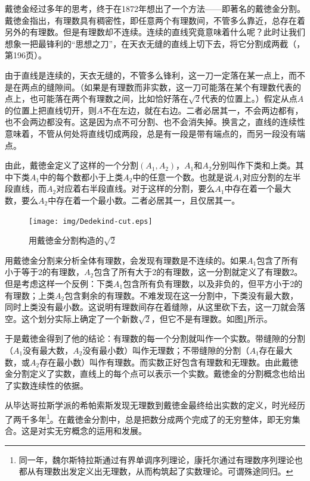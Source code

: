 \documentclass{article}
\begin{document}
戴徳金经过多年的思考，终于在1872年想出了一个方法——即著名的戴徳金分割。戴徳金指出，有理数具有稠密性，即任意两个有理数间，不管多么靠近，总存在着另外的有理数。但是有理数却不连续。连续的直线究竟意味着什么呢？此时让我们想象一把最锋利的“思想之刀”，在天衣无缝的直线上切下去，将它分割成两截（\cite{HanXueTao16}，第196页）。

由于直线是连续的，天衣无缝的，不管多么锋利，这一刀一定落在某一点上，而不是在两点的缝隙间。（如果是有理数而非实数，这一刀可能落在某个有理数代表的点上，也可能落在两个有理数之间，比如恰好落在$\sqrt{2}$代表的位置上。）假定从点$A$的位置上把直线切开，则$A$不在左边，就在右边。二者必居其一，不会两边都有，也不会两边都没有。这是因为点不可分割、也不会消失掉。换言之，直线的连续性意味着，不管从何处将直线切成两段，总是有一段是带有端点的，而另一段没有端点。

由此，戴徳金定义了这样的一个分割$(A_1, A_2)$，$A_1$和$A_2$分别叫作下类和上类。其中下类$A_1$中的每个数都小于上类$A_2$中的任意一个数。也就是说$A_1$对应分割的左半段直线，而$A_2$对应着右半段直线。对于这样的分割，要么$A_1$中存在着一个最大数，要么$A_2$中存在着一个最小数。二者必居其一，且仅居其一。

\begin{figure}[htbp]
 \centering
 \texttt{[image: img/Dedekind-cut.eps]}
 \caption{用戴徳金分割构造的$\sqrt{2}$}
 \label{fig:Dedekind-cut}
\end{figure}

用戴徳金分割来分析全体有理数，会发现有理数是不连续的。如果$A_1$包含了所有小于等于2的有理数，$A_2$包含了所有大于2的有理数，这一分割就定义了有理数2。但是考虑这样一个反例：下类$A_1$包含所有负有理数，以及非负的，但平方小于2的有理数；上类$A_2$包含剩余的有理数。不难发现在这一分割中，下类没有最大数，同时上类没有最小数。这说明有理数间存在着缝隙，从这里砍下去，这一刀就会落空。这个划分实际上确定了一个新数$\sqrt{2}$，但它不是有理数。如图\ref{fig:Dedekind-cut}所示。

于是戴徳金得到了他的结论：有理数的每一个分割就叫作一个实数。带缝隙的分割（$A_1$没有最大数，$A_2$没有最小数）叫作无理数；不带缝隙的分割（$A_1$存在最大数，或$A_2$存在最小数）叫作有理数。而实数正好包含有理数和无理数。由此戴徳金分割定义了实数，直线上的每个点可以表示一个实数。戴徳金的分割概念也给出了实数连续性的依据。

从毕达哥拉斯学派的希帕索斯发现无理数到戴徳金最终给出实数的定义，时光经历了两千多年\footnote{同一年，魏尔斯特拉斯通过有界单调序列理论，康托尔通过有理数序列理论也都从有理数出发定义出无理数，从而构筑起了实数理论。可谓殊途同归。}。在戴徳金分割中，总是把数分成两个完成了的无穷整体，即无穷集合。这是对实无穷概念的运用和发展。
\end{document}
